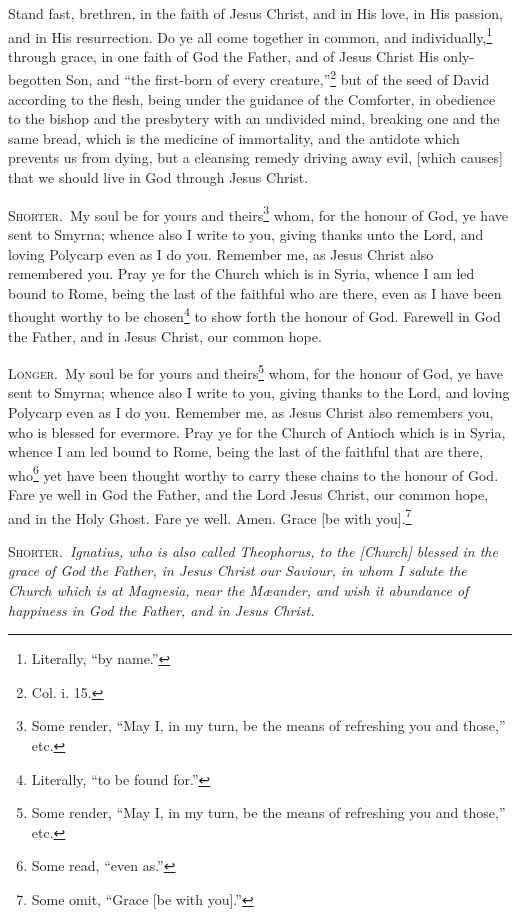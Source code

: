 Stand fast, brethren, in the faith of Jesus Christ, and in His love, in His passion, and in His resurrection. Do ye all come together in common, and individually,\footnote{Literally, “by name.”} through grace, in one faith of God the Father, and of Jesus Christ His only-begotten Son, and “the first-born of every creature,”\footnote{Col. i. 15.} but of the seed of David according to the flesh, being under the guidance of the Comforter, in obedience to the bishop and the presbytery with an undivided mind, breaking one and the same bread, which is the medicine of immortality, and the antidote which prevents us from dying, but a cleansing remedy driving away evil, [which causes] that we should live in God through Jesus Christ.


\textsc{Shorter.}~My soul be for yours and theirs\footnote{Some render, “May I, in my turn, be the means of refreshing you and those,” etc.} whom, for the honour of God, ye have sent to Smyrna; whence also I write to you, giving thanks unto the Lord, and loving Polycarp even as I do you. Remember me, as Jesus Christ also remembered you. Pray ye for the Church which is in Syria, whence I am led bound to Rome, being the last of the faithful who are there, even as I have been thought worthy to be chosen\footnote{Literally, “to be found for.”} to show forth the honour of God. Farewell in God the Father, and in Jesus Christ, our common hope.

\textsc{Longer.}~My soul be for yours and theirs\footnote{Some render, “May I, in my turn, be the means of refreshing you and those,” etc.} whom, for the honour of God, ye have sent to Smyrna; whence also I write to you, giving thanks to the Lord, and loving Polycarp even as I do you. Remember me, as Jesus Christ also remembers you, who is blessed for evermore. Pray ye for the Church of Antioch which is in Syria, whence I am led bound to Rome, being the last of the faithful that are there, who\footnote{Some read, “even as.”} yet have been thought worthy to carry these chains to the honour of God. Fare ye well in God the Father, and the Lord Jesus Christ, our common hope, and in the Holy Ghost. Fare ye well. Amen. Grace [be with you].\footnote{Some omit, “Grace [be with you].”}


\textsc{Shorter.}~\emph{Ignatius, who is also called Theophorus, to the [Church] blessed in the grace of God the Father, in Jesus Christ our Saviour, in whom I salute the Church which is at Magnesia, near the Mæander, and wish it abundance of happiness in God the Father, and in Jesus Christ.}

